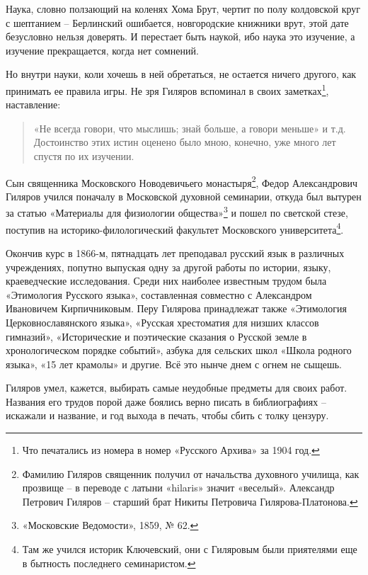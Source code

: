Наука, словно ползающий на коленях Хома Брут, чертит по полу колдовской круг с шептанием – Берлинский ошибается, новгородские книжники врут, этой дате безусловно нельзя доверять. И перестает быть наукой, ибо наука это изучение, а изучение прекращается, когда нет сомнений.

Но внутри науки, коли хочешь в ней обретаться, не остается ничего другого, как принимать ее правила игры. Не зря Гиляров вспоминал в своих заметках\footnote{Что печатались из номера в номер «Русского Архива» за 1904 год.}, наставление:

\begin{quotation}
«Не всегда говори, что мыслишь; знай больше, а говори меньше» и т.д. Достоинство этих истин оценено было мною, конечно, уже много лет спустя по их изучении.
\end{quotation}

Сын священника Московского Новодевичьего монастыря\footnote{Фамилию Гиляров священник получил от начальства духовного училища, как прозвище – в переводе с латыни «hilaris» значит «веселый». Александр Петрович Гиляров – старший брат Никиты Петровича Гилярова-Платонова.}, Федор Александрович Гиляров учился поначалу в Московской духовной семинарии, откуда был вытурен за статью «Материалы для физиологии общества»\footnote{«Московские Ведомости», 1859, № 62.} и пошел по светской стезе, поступив на историко-филологи\-ческий факультет Московского университета\footnote{Там же учился историк Ключевский, они с Гиляровым были приятелями еще в бытность последнего семинаристом.}. 

Окончив курс в 1866-м, пятнадцать лет преподавал русский язык в различных учреждениях, попутно выпуская одну за другой работы по истории, языку, краеведческие исследования. Среди них наиболее известным трудом была «Этимология Русского языка», составленная совместно с Александром Ивановичем Кирпичниковым. Перу Гилярова принадлежат также «Этимология Церковнославянского языка», «Русская хрестоматия для низших классов гимназий», «Исторические и поэтические сказания о Русской земле в хронологическом порядке событий», азбука для сельских школ «Школа родного языка», «15 лет крамолы» и другие. Всё это нынче днем с огнем не сыщешь.

Гиляров умел, кажется, выбирать самые неудобные предметы для своих работ. Названия его трудов порой даже боялись верно писать в библиографиях – искажали и название, и год выхода в печать, чтобы сбить с толку цензуру.

